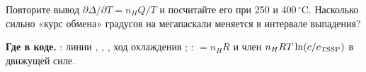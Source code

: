 \begin{exercise}
Повторите вывод $\partial\Delta/\partial T=n_HQ/T$ и посчитайте его при 250 и 400\,$^\circ$C.
Насколько сильно «курс обмена» градусов на мегапаскали меняется в интервале выпадения?
\end{exercise}

\begin{codebox}
\textbf{Где в коде.} : линии , , , ход
охлаждения ; :  $=n_HR$ и член
$n_HRT\ln(c/c_{\mathrm{TSSP}})$ в движущей силе.
\end{codebox}
